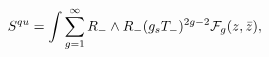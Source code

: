 \begin{equation}
 S^{qu} = \int \sum_{g=1}^{\infty} R_- \wedge R_- (g_s T_-)^{2g - 2} {\cal
 F}_g(z, \bar{z}),
\end{equation}

